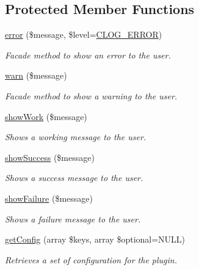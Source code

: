 \subsection*{Protected Member Functions}
\begin{DoxyCompactItemize}
\item 
\hyperlink{classGenericPlugin_adb26ae57ef8765d8bb18f26216c5c2d6}{error} (\$message, \$level=\hyperlink{group__log__levels_gacd8b449d24550e76fa0b9682e816da94}{C\-L\-O\-G\-\_\-\-E\-R\-R\-O\-R})
\begin{DoxyCompactList}\small\item\em Facade method to show an error to the user. \end{DoxyCompactList}\item 
\hyperlink{classGenericPlugin_adc5289a073a5cae7197286792c7eb5e9}{warn} (\$message)
\begin{DoxyCompactList}\small\item\em Facade method to show a warning to the user. \end{DoxyCompactList}\item 
\hyperlink{classGenericPlugin_a6aaf2e225dcab0c5d759373d0ede60ce}{show\-Work} (\$message)
\begin{DoxyCompactList}\small\item\em Shows a working message to the user. \end{DoxyCompactList}\item 
\hyperlink{classGenericPlugin_aa6fa4fa1e988c64b045fe552c0905fbb}{show\-Success} (\$message)
\begin{DoxyCompactList}\small\item\em Shows a success message to the user. \end{DoxyCompactList}\item 
\hyperlink{classGenericPlugin_af2e0d786211846ea2b67841adb506c5d}{show\-Failure} (\$message)
\begin{DoxyCompactList}\small\item\em Shows a failure message to the user. \end{DoxyCompactList}\item 
\hyperlink{classGenericPlugin_a1c51ad511694c82131181d5f4c77d34c}{get\-Config} (array \$keys, array \$optional=N\-U\-L\-L)
\begin{DoxyCompactList}\small\item\em Retrieves a set of configuration for the plugin. \end{DoxyCompactList}\end{DoxyCompactItemize}


